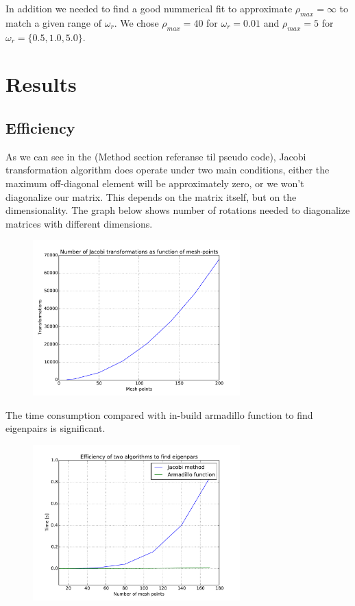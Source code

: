 \documentclass[a4paper, 10pt]{article}
\begin{document}
In addition we needed to find a good nummerical fit to approximate \(\rho_{max}=\infty\) to match
a given range of \(\omega_{r}\). We chose \(\rho_{max} = 40\) for \(\omega_{r}
= 0.01\) and \(\rho_{max}= 5\) for \(\omega_{r} = \{0.5, 1.0, 5.0\}\).
\section{Results}

\subsection{Efficiency}
As we can see in the (Method section referanse til pseudo code), Jacobi
transformation algorithm does operate under two main conditions, either the
maximum off-diagonal element will be approximately zero, or we won't
diagonalize our matrix. This depends on the matrix itself, but on the
dimensionality. The graph below shows number of rotations needed to diagonalize
matrices with different dimensions.
\begin{figure}[h!]
  \centering
  \includegraphics[width=8cm]{transformations.pdf}
  \caption{}
\end{figure}

The time consumption compared with in-build armadillo function to find
eigenpairs is significant.



\begin{figure}[h!]
  \centering
  \includegraphics[width=8cm]{timePlot.pdf}
  \caption{}
\end{figure}
\end{document}
